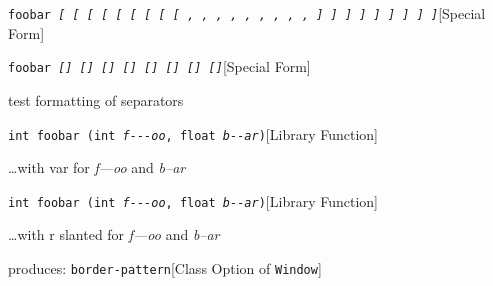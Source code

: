 \documentclass{book}
\begin{document}
\noindent\texttt{foobar \EmbracOn{}\textsl{[ \EmbracOff{}\textnormal{[}\EmbracOn{} \EmbracOff{}\textsl{[}\EmbracOn{} \EmbracOff{}\texttt{[}\EmbracOn{} \EmbracOff{}\texttt{[}\EmbracOn{} \EmbracOff{}\textnormal{\textsl{[}}\EmbracOn{} \EmbracOff{}\textnormal{\texttt{[}}\EmbracOn{} \EmbracOff{}\textnormal{\texttt{\textsl{[}}}\EmbracOn{} \EmbracOff{}\textnormal{\texttt{[}}\EmbracOn{} , \EmbracOff{}\textnormal{,}\EmbracOn{} \EmbracOff{}\textsl{,}\EmbracOn{} \EmbracOff{}\texttt{,}\EmbracOn{} \EmbracOff{}\texttt{,}\EmbracOn{} \EmbracOff{}\textnormal{\textsl{,}}\EmbracOn{} \EmbracOff{}\textnormal{\texttt{,}}\EmbracOn{} \EmbracOff{}\textnormal{\texttt{\textsl{,}}}\EmbracOn{} \EmbracOff{}\textnormal{\texttt{,}}\EmbracOn{} ] \EmbracOff{}\textnormal{]}\EmbracOn{} \EmbracOff{}\textsl{]}\EmbracOn{} \EmbracOff{}\texttt{]}\EmbracOn{} \EmbracOff{}\texttt{]}\EmbracOn{} \EmbracOff{}\textnormal{\textsl{]}}\EmbracOn{} \EmbracOff{}\textnormal{\texttt{]}}\EmbracOn{} \EmbracOff{}\textnormal{\texttt{\textsl{]}}}\EmbracOn{} \EmbracOff{}\textnormal{\texttt{]}}\EmbracOn{}}}\hfill[Special Form]



%
\noindent\texttt{foobar \EmbracOn{}\textsl{[] \EmbracOff{}\textnormal{[]}\EmbracOn{} \EmbracOff{}\textsl{[]}\EmbracOn{} \EmbracOff{}\texttt{[]}\EmbracOn{} \EmbracOff{}\texttt{[]}\EmbracOn{} \EmbracOff{}\textnormal{\textsl{[]}}\EmbracOn{} \EmbracOff{}\textnormal{\texttt{[]}}\EmbracOn{} \EmbracOff{}\textnormal{\texttt{\textsl{[]}}}\EmbracOn{}}}\hfill[Special Form]



%
test formatting of separators

\noindent\texttt{int foobar (int \textsl{f{-}{-}{-}oo}, float \textsl{b{-}{-}ar})}\hfill[Library Function]



%
\dots{}\@ with var for \textsl{f---oo} and \textsl{b--ar}

\noindent\texttt{int foobar (int \textnormal{\textsl{f{-}{-}{-}oo}}, float \textnormal{\textsl{b{-}{-}ar}})}\hfill[Library Function]



%
\dots{}\@ with r slanted for \textsl{f---oo} and \textsl{b--ar}

\noindent{}produces:
\noindent\texttt{border-pattern}\hfill[Class Option of \texttt{Window}]
\end{document}

